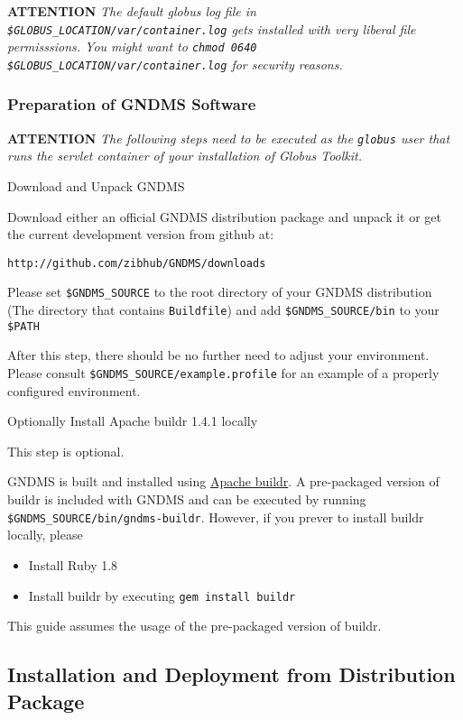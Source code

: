 \documentclass{article}
\begin{document}
\textbf{ATTENTION}
\emph{The default globus log file in \texttt{\$GLOBUS\_LOCATION/var/container.log} gets installed with very liberal file permisssions. You might want to \texttt{chmod 0640 \$GLOBUS\_LOCATION/var/container.log} for security reasons.}

\subsubsection{Preparation of GNDMS Software}

\textbf{ATTENTION}
\emph{The following steps need to be executed as the \texttt{globus} user that runs the servlet container of your installation of Globus Toolkit.}

Download and Unpack GNDMS

Download either an official GNDMS distribution package and unpack
it or get the current development version from github at:

  \verb!http://github.com/zibhub/GNDMS/downloads!

Please set \verb!$GNDMS_SOURCE! to the root directory of your GNDMS
distribution (The directory that contains \verb!Buildfile!) and add
\verb!$GNDMS_SOURCE/bin! to your \verb!$PATH!

After this step, there should be no further need to adjust your
environment. Please consult \verb!$GNDMS_SOURCE/example.profile!
for an example of a properly configured environment.

Optionally Install Apache buildr 1.4.1 locally

This step is optional.

GNDMS is built and installed using
\href{http:///buildr.apache.org}{Apache buildr}. A pre-packaged
version of buildr is included with GNDMS and can be executed by
running \verb!$GNDMS_SOURCE/bin/gndms-buildr!. However, if you
prever to install buildr locally, please

\begin{itemize}
\item
  Install Ruby 1.8
\item
  Install buildr by executing \verb!gem install buildr!
\end{itemize}
This guide assumes the usage of the pre-packaged version of
buildr.

\subsection{Installation and Deployment from Distribution Package}
\end{document}
